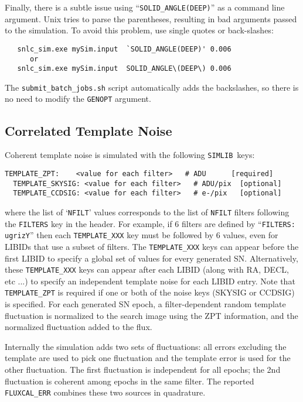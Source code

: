 \documentclass[12pt]{article}
\newcommand{\simlib}{{\tt SIMLIB}}
\newcommand{\submit}{\tt submit\_batch\_jobs.sh}
\begin{document}
{\medskip
Finally, there is a subtle issue using ``{\tt SOLID\_ANGLE(DEEP)}''
as a command line argument. Unix tries to parse the parentheses,
resulting in bad arguments passed to the simulation. To avoid
this problem, use single quotes or back-slashes:
\begin{verbatim}
   snlc_sim.exe mySim.input  `SOLID_ANGLE(DEEP)' 0.006
      or
   snlc_sim.exe mySim.input  SOLID_ANGLE\(DEEP\) 0.006
\end{verbatim}
The {\submit} script automatically adds the backslashes,
so there is no need to modify the {\tt GENOPT} argument.



\clearpage
\subsection{Correlated Template Noise}
\label{subsec:template_noise}

Coherent template noise is simulated with the following \simlib\ keys:
%
\begin{Verbatim}[frame=single]
  TEMPLATE_ZPT:    <value for each filter>   # ADU      [required]
  TEMPLATE_SKYSIG: <value for each filter>   # ADU/pix  [optional]
  TEMPLATE_CCDSIG: <value for each filter>   # e-/pix   [optional]
\end{Verbatim}
%
where the list of `{\tt NFILT}' values corresponds to the list of 
{\tt NFILT} filters following the {\tt FILTERS} key in the header.
For example, if 6 filters are defined by ``{\tt FILTERS: ugrizY}''
then each {\tt TEMPLATE\_XXX} key must be followed by 6 values,
even for LIBIDs that use a subset of filters.
The {\tt TEMPLATE\_XXX} keys can appear before the first LIBID 
to specify a global set of values for every generated SN.
Alternatively, these {\tt TEMPLATE\_XXX} keys can appear after each 
LIBID (along with RA, DECL, etc ...) to specify an independent 
template noise for each LIBID entry.
Note that {\tt TEMPLATE\_ZPT} is required if one or
both of the noise keys (SKYSIG or CCDSIG) is specified.
For each generated SN epoch, 
a filter-dependent random template fluctuation is normalized 
to the search image using the ZPT information,
and the normalized fluctuation added to the flux.

Internally the simulation adds two sets of fluctuations:
all errors excluding the template are used to pick one
fluctuation and the template error is used for the 
other fluctuation. The first fluctuation is independent
for all epochs; the 2nd fluctuation is coherent among
epochs in the same filter.  The reported {\tt FLUXCAL\_ERR}
combines these two sources in quadrature. 

}
\end{document}
